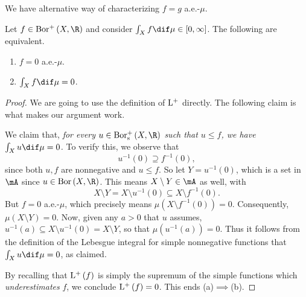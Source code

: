 \documentclass[pmath450]{subfiles}
\begin{document}
    \np We have alternative way of characterizing $f=g$ a.e.-$\mu$.

    \begin{lemma}{}
        Let $f\in\borplus\left( X,\R \right)$ and consider $\int_Xf\dif\mu\in\left[ 0,\infty \right]$. The following are equivalent.
        \begin{enumerate}
            \item $f=0$ a.e.-$\mu$.
            \item $\int_Xf\dif\mu=0$.
        \end{enumerate}
    \end{lemma}

    \begin{proof}
        We are going to use the definition of $\operatorname{L^+}$ directly. The following claim is what makes our argument work.

        We claim that, \textit{for every $u\in\borpluss\left( X,\R \right)$ such that $u\leq f$, we have $\int_Xu\dif\mu=0$.} To verify this, we observe that
        \begin{equation*}
            u^{-1}\left( 0 \right) \supseteq f^{-1}\left( 0 \right),
        \end{equation*}
        since both $u,f$ are nonnegative and $u\leq f$. So let $Y = u^{-1}\left( 0 \right)$, which is a set in $\mA$ since $u\in\bor\left( X,\R \right)$. This means $X\setminus Y\in\mA$ as well, with
        \begin{equation*}
            X\setminus Y = X\setminus u^{-1}\left( 0 \right) \subseteq X\setminus f^{-1}\left( 0 \right).
        \end{equation*}
        But $f=0$ a.e.-$\mu$, which precisely means $\mu\left( X\setminus f^{-1}\left( 0 \right) \right)=0$. Consequently, $\mu\left( X\setminus Y \right)=0$. Now, given any $a>0$ that $u$ assumes, $u^{-1}\left( a \right)\subseteq X\setminus u^{-1}\left( 0 \right) = X\setminus Y$, so that $\mu\left( u^{-1}\left( a \right) \right)=0$. Thus it follows from the definition of the Lebesgue integral for simple nonnegative functions that $\int_Xu\dif\mu=0$, as claimed.

        By recalling that $\operatorname{L^+}\left( f \right)$ is simply the supremum of the simple functions which \textit{underestimates} $f$, we conclude $\operatorname{L^+}\left( f \right)=0$. This ends (a)$\implies$(b).


\end{proof}
\end{document}

